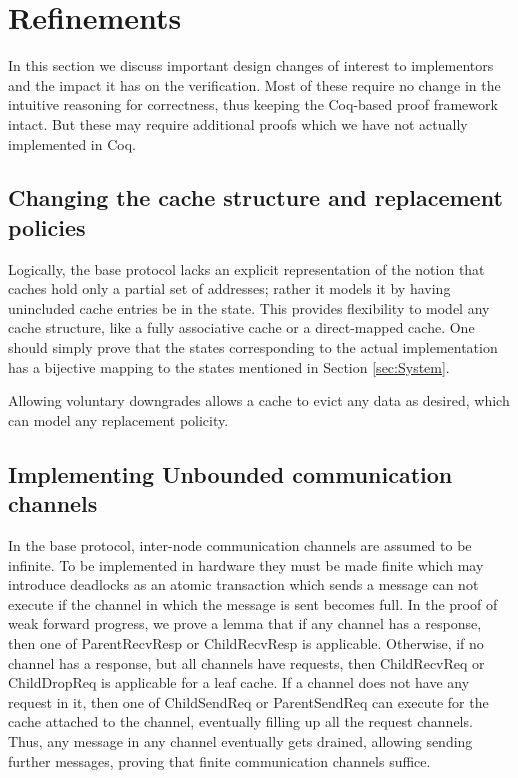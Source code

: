 \section{Refinements}
\label{sec:Refinements}

In this section we discuss important design changes of interest to implementors
and the impact it has on the verification. Most of these require no change in
the intuitive reasoning for correctness, thus keeping the Coq-based proof
framework intact. But these may require additional proofs which we have not
actually implemented in Coq.


\subsection{Changing the cache structure and replacement policies}

Logically, the base protocol lacks an explicit representation of the notion
that caches hold only a partial set of addresses; rather it models it by having
unincluded cache entries be in the \In{} state. This provides
flexibility to model any cache structure, like a fully associative cache or a
direct-mapped cache. One should simply prove that the states corresponding to
the actual implementation has a bijective mapping to the states mentioned in
Section \ref{sec:System}.

Allowing voluntary downgrades allows a cache to evict any data as desired,
which can model any replacement policity.

\subsection{Implementing Unbounded communication channels}

In the base protocol, inter-node communication channels are assumed to be
infinite. To be implemented in hardware they must be made finite which may
introduce deadlocks as an atomic transaction which sends a message can not
execute if the channel in which the message is sent becomes full. In the proof
of weak forward progress, we prove a lemma that if any channel has a response,
then one of ParentRecvResp or ChildRecvResp is applicable. Otherwise, if no
channel has a response, but all channels have requests, then ChildRecvReq or
ChildDropReq is applicable for a leaf cache. If a channel does not have any
request in it, then one of ChildSendReq or ParentSendReq can execute for the
cache attached to the channel, eventually filling up all the request channels.
Thus, any message in any channel eventually gets drained, allowing sending
further messages, proving that finite communication channels suffice.

